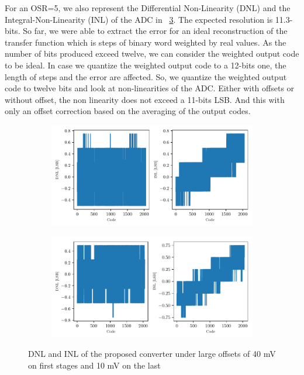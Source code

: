 For an OSR=5, we also represent the Differential Non-Linearity (DNL) and the Integral-Non-Linearity (INL) of the ADC in \figurename~\ref{fig:adc-osr-dnl-inl}. The expected resolution is 11.3-bits. So far, we were able to extract the error for an ideal reconstruction of the transfer function which is steps of binary word weighted by real values. As the number of bits produced exceed twelve, we can consider the weighted output code to be ideal. In case we quantize the weighted output code to a 12-bits one, the length of steps and the error are affected. So, we quantize the weighted output code to twelve bits and look at non-linearities of the ADC\@. Either with offsets or without offset, the non linearity does not exceed a 11-bits LSB\@. And this with only an offset correction based on the averaging of the output codes.

\begin{figure}[htp]
	\centering
	\begin{subfigure}[b]{0.8\textwidth}
		\centering
		\includegraphics[width=\textwidth]{Chapter4/Figs/results/adc/dnl-inl-osr5.pdf}
		\label{fig:adc-osr5-error-offset}
	\end{subfigure}
	\begin{subfigure}[b]{0.8\textwidth}
		\centering
		\includegraphics[width=\textwidth]{Chapter4/Figs/results/adc/dnl-inl-osr5-40mV-40mV-10mV.pdf}
		\label{fig:adc-osr6-error-offset}
	\end{subfigure}
	\caption{DNL and INL of the proposed converter under large offsets of 40 mV on first stages and 10 mV on the last}
	\label{fig:adc-osr-dnl-inl}
\end{figure}

